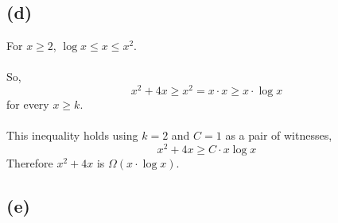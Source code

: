 \documentclass[]{article}
\begin{document}
\subsection*{(d)}
For $x \geq 2$, $\log x \leq x \leq x^2$.
\\
\\
So,
$$x^2+4x \geq x^2 = x \cdot x \geq x \cdot \log x$$
for every $x \geq k$.
\\
\\
This inequality holds using $k = 2$ and $C = 1$ as a pair of witnesses,
$$x^2+4x \geq C \cdot x \log x$$
Therefore $x^2+4x$ is $\Omega (x \cdot \log x)$.
\subsection*{(e)}
\end{document}
